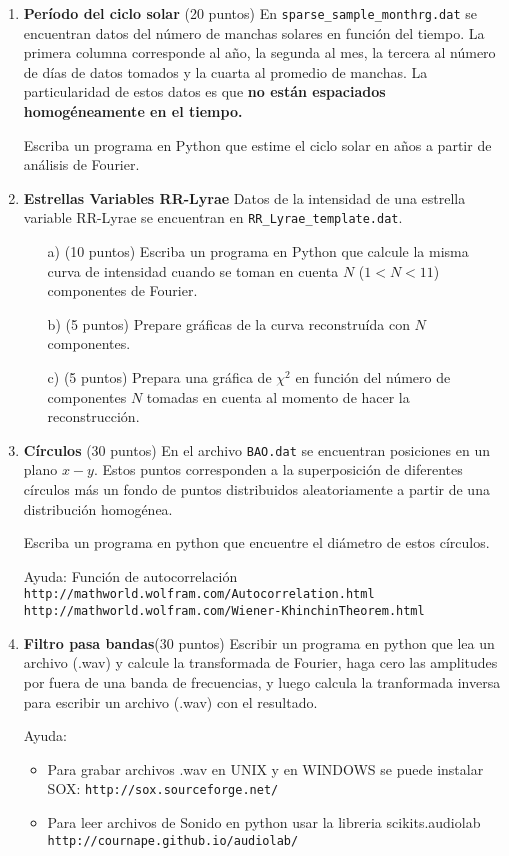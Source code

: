 \documentclass{article}
\begin{document}
\begin{enumerate}
\item
{\bf Per\'iodo del ciclo solar} (20 puntos)
En \verb"sparse_sample_monthrg.dat" se encuentran datos del n\'umero
de manchas solares en funci\'on del tiempo. La primera columna
corresponde al a\~no, la segunda al mes, la tercera al n\'umero de
d\'ias de datos tomados y la cuarta al promedio de manchas. La
particularidad de estos datos es que {\bf no est\'an espaciados
  homog\'eneamente en el tiempo.} 

Escriba un programa en Python que estime el ciclo solar en a\~nos a
partir de an\'alisis de Fourier.


\item
{\bf Estrellas Variables RR-Lyrae}
Datos de la intensidad de una estrella variable RR-Lyrae se encuentran
en \verb"RR_Lyrae_template.dat". 

\begin{itemize}
\item[a)] (10 puntos) Escriba un programa en Python que calcule la
  misma curva de intensidad cuando se toman en cuenta $N$ ($1<N<11$)
  componentes de Fourier. 
\item[b)] (5 puntos) Prepare gr\'aficas de la curva reconstru\'ida con $N$
componentes.  
\item[c)] (5 puntos)
Prepara una gr\'afica de $\chi^2$ en funci\'on del n\'umero de
componentes $N$ tomadas en cuenta al momento de hacer la
reconstrucci\'on.   
\end{itemize}

\item

{\bf C\'irculos} (30 puntos)
En el archivo \verb"BAO.dat" se encuentran posiciones en un plano
$x-y$. Estos puntos corresponden a la superposici\'on de diferentes
c\'irculos m\'as un fondo de puntos distribuidos aleatoriamente a
partir de una distribuci\'on homog\'enea. 

Escriba un programa en python que encuentre el di\'ametro de estos
c\'irculos. 

Ayuda:
Funci\'on de autocorrelaci\'on \\ 
\verb"http://mathworld.wolfram.com/Autocorrelation.html"\\
\verb"http://mathworld.wolfram.com/Wiener-KhinchinTheorem.html"

\item {\bf Filtro pasa bandas}(30 puntos) 
Escribir un programa en python que lea un archivo (.wav) y
  calcule la transformada de Fourier, haga cero las amplitudes por fuera de una
banda de frecuencias, y luego calcula la tranformada inversa para escribir
un archivo (.wav) con el resultado.

Ayuda:
\begin{itemize}
\item Para grabar archivos .wav en UNIX y en WINDOWS  se puede
  instalar SOX:
  \verb"http://sox.sourceforge.net/"
  
\item 
  Para leer archivos de Sonido en python usar la libreria
  scikits.audiolab
 \verb"http://cournape.github.io/audiolab/"
\end{itemize}

\end{enumerate}
\end{document}
